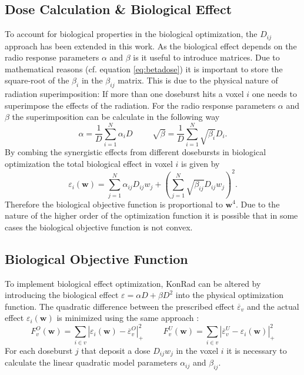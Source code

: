 \subsection{Dose Calculation \& Biological Effect}
To account for biological properties in the biological optimization, the $D_{ij}$ approach has been extended in this work. As the biological effect depends on the radio response parameters $\alpha$ and $\beta$ is it useful to introduce matrices. Due to mathematical reasons (cf. equation \ref{eq:betadose}) it is important to store the square-root of the $\beta_i$ in the $\beta_{ij}$ matrix. This is due to the physical nature of radiation superimposition: If more than one doseburst hits a voxel $i$ one needs to superimpose the effects of the radiation. For the radio response parameters $\alpha$ and $\beta$ the superimposition can be calculate in the following way \cite{pmid7413933} \cite{pmid16757867}
\begin{equation}\label{eq:betadose}
\alpha = \frac{1}{D}\sum\limits_{i=1}^N\alpha_i D\hspace{1cm}\sqrt{\beta} = \frac{1}{D}\sum\limits_{i=1}^N\sqrt{\beta_i}D_i.
\end{equation}
By combing the synergistic effects from different dosebursts in biological optimization the total biological effect in voxel $i$ is given by \cite{pmid16757867}
\begin{equation}
\varepsilon_i(\mathbf{w}) = \sum\limits_{j=1}^N\alpha_{ij}D_{ij}w_j+\left(\sum\limits_{j=1}^N\sqrt{\beta_{ij}}D_{ij}w_j\right)^2.
\end{equation}
Therefore the biological objective function is proportional to $\mathbf{w}^4$. Due to the nature of the higher order of the optimization function it is possible that in some cases the biological objective function is not convex\cite{FreseThesis}.
\subsection{Biological Objective Function}
To implement biological effect optimization, KonRad can be altered by introducing the biological effect $\varepsilon = \alpha D + \beta D^2$ into the physical optimization function. The quadratic difference between the prescribed effect $\overline{\varepsilon}_v$ and the actual effect $\varepsilon_i(\mathbf{w})$ is minimized using the same approach \cite{FreseThesis}:
\begin{equation}
F_v^O (\mathbf{w}) = \sum\limits_{i\in v} \left|\varepsilon_i(\mathbf{w})-\overline{\varepsilon}_v^O\right|_+^2\hspace{1cm}F_v^U (\mathbf{w}) = \sum\limits_{i\in v} \left|\overline{\varepsilon}_v^U-\varepsilon_i(\mathbf{w})\right|_+^2
\end{equation}
For each doseburst $j$ that deposit a dose $D_{ij}w_j$ in the voxel $i$ it is necessary to calculate the linear quadratic model parameters $\alpha_{ij}$ and $\beta_{ij}$.

